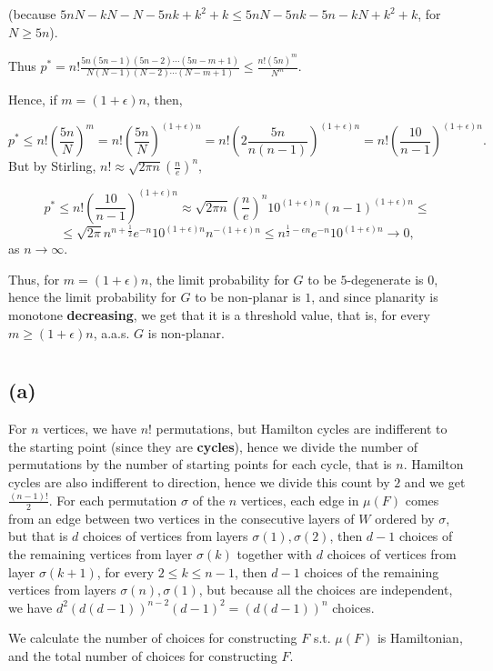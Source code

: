 \documentclass{article}
\begin{document}
(because $5nN-kN-N-5nk+k^2+k\leq5nN-5nk-5n-kN+k^2+k$, for $N\geq5n$).

Thus $p^\ast=n!\frac{5n(5n-1)(5n-2)\cdots(5n-m+1)}{N(N-1)(N-2)\cdots(N-m+1)}\leq\frac{n!(5n)^m}{N^m}$.

Hence, if $m=(1+\epsilon)n$, then,

\[
p^\ast\leq{n!(\frac{5n}{N})^m}=n!(\frac{5n}{N})^{(1+\epsilon)n}=n!(2\frac{5n}{n(n-1)})^{(1+\epsilon)n}=n!(\frac{10}{n-1})^{(1+\epsilon)n}.
\]
But by Stirling, $n!\approx\sqrt{2\pi{n}}(\frac{n}{e})^n$,

\[p^\ast\leq{n!(\frac{10}{n-1})^{(1+\epsilon)n}}\approx\sqrt{2\pi{n}}(\frac{n}{e})^n10^{(1+\epsilon)n}(n-1)^{(1+\epsilon)n}\leq\]\[\leq\sqrt{2\pi}n^{n+\frac{1}{2}}e^{-n}10^{(1+\epsilon)n}n^{-(1+\epsilon)n}\leq{n^{\frac{1}{2}-\epsilon{n}}e^{-n}10^{(1+\epsilon)n}}\rightarrow{0},
\]
as $n\rightarrow\infty$.

Thus, for $m=(1+\epsilon)n$, the limit probability for $G$ to be $5$-degenerate is {0}, hence the limit probability for $G$ to be non-planar is $1$, and since planarity is monotone \textbf{decreasing}, we get that it is a threshold value, that is, for every $m\geq(1+\epsilon)n$, a.a.s. $G$ is non-planar.
\section{}
\subsection*{(a)}
For $n$ vertices, we have $n!$ permutations, but Hamilton cycles are indifferent to the starting point (since they are \textbf{cycles}), hence we divide the number of permutations by the number of starting points for each cycle, that is $n$. Hamilton cycles are also indifferent to direction, hence we divide this count by $2$ and we get $\frac{(n-1)!}{2}$. For each permutation $\sigma$ of the $n$ vertices, each edge in $\mu(F)$ comes from an edge between two vertices in the consecutive layers of $W$ ordered by $\sigma$, but that is $d$ choices of vertices from layers $\sigma(1),\sigma(2)$, then $d-1$ choices of the remaining vertices from layer $\sigma(k)$ together with $d$ choices of vertices from layer $\sigma(k+1)$, for every $2\leq{k}\leq{n-1}$, then $d-1$ choices of the remaining vertices from layers $\sigma(n),\sigma(1)$, but because all the choices are independent, we have $d^2(d(d-1))^{n-2}(d-1)^2=(d(d-1))^n$ choices.

We calculate the number of choices for constructing $F$ s.t. $\mu(F)$ is Hamiltonian, and the total number of choices for constructing $F$.
\end{document}
